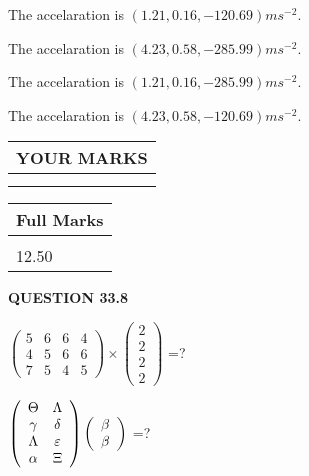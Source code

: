 \documentclass[12pt]{article}
\begin{document}
  
 
 
  The accelaration is $  %
(
1.21,
0.16,
-120.69)
ms^{-2} $.
 
 
  The accelaration is $  %
(
4.23,
0.58,
-285.99)
ms^{-2} $.
 
 
  The accelaration is $  %
(
1.21,
0.16,
-285.99)
ms^{-2} $.
 
 
  The accelaration is $  %
(
4.23,
0.58,
-120.69)
ms^{-2} $.
 
 
 

 
 
\vspace{0.3in}
  
\vspace{0.2in}
  
\noindent\begin{tabular}{|l|}
\hline
 YOUR MARKS  \\
\hline
 \\ 
 \\ 
\hline
\end{tabular}
\hspace{0.05in} \begin{tabular}{|l|}
\hline
 Full Marks  \\
\hline
 \\ 
12.50 \\
\hline
\end{tabular}
{\textbf{\Large{QUESTION
33.8 
}}}
  
  
 
$ \left( \begin{array}{ccccccccc}
           5  & 
           6  & 
           6  & 
           4  \\ 
           4  & 
           5  & 
           6  & 
           6  \\ 
           7  & 
           5  & 
           4  & 
           5
\end{array}\right) \times
\left( \begin{array}{c}
           2  \\ 
           2  \\ 
           2  \\ 
           2
\end{array}\right) $ =?
 
 
$  %
 \left( \begin{array}
 {
 c
 c
 }
 \Theta & 
 \Lambda \\ 
 \gamma & 
 \delta \\ 
 \Lambda & 
 \varepsilon \\ 
 \alpha & 
                    \Xi
 \end{array} \right)
 \left( \begin{array}
 {
 c
 }
 \beta \\ 
 \beta
 \end{array} \right)
$ =?
 
\end{document}
